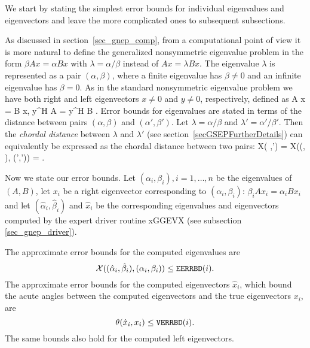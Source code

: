 We start by stating the simplest error bounds for individual eigenvalues
and eigenvectors and leave the more complicated ones to subsequent
subsections. 

As discussed in section~\ref{sec_gnep_comp},
from a computational point of view it is more natural to define
the generalized nonsymmetric eigenvalue problem in
the form $\beta A x = \alpha B x$ with $\lambda = \alpha / \beta$
instead of $A x = \lambda B x$.  The eigenvalue $\lambda$ is represented
as a pair $(\alpha, \beta)$, where a finite
eigenvalue has $\beta \neq 0$ and an infinite eigenvalue has $\beta = 0$.
As in the standard nonsymmetric eigenvalue problem we have both right
and left eigenvectors $x \neq 0$ and $y \neq 0$, respectively, defined as
\bq\label{eq411.1}
\beta A x = \alpha B x, \quad \beta y^H A  = \alpha y^H B .
\eq
Error bounds for eigenvalues are stated in terms of
the distance between pairs $(\alpha, \beta)$ and $(\alpha',\beta')$.
Let $\lambda = \alpha/\beta$ and $\lambda' = \alpha'/\beta'$.
Then the {\em chordal distance} between $\lambda$ and
$\lambda'$ (see section~\ref{secGSEPFurtherDetails})
can equivalently be expressed as the chordal distance between two pairs:
\bq\label{eq411.2}
{\cal X}( \lambda,\lambda') =
{\cal X}((\alpha, \beta), (\alpha',\beta')) = .
\eq

Now we state our error bounds.
Let $({\alpha}_i, {\beta}_i), i = 1, \ldots, n$ be the eigenvalues of $(A, B)$,
let $x_i$ be a right eigenvector corresponding to $({\alpha}_i, {\beta}_i)$:
${\beta}_i A x_i = {\alpha}_i B x_i$ and let
$({\hat{\alpha}}_i, {\hat{\beta}}_i)$
and $\hat{x}_i$ be the corresponding eigenvalues and
eigenvectors computed by the expert driver routine
xGGEVX (see subsection \ref{sec_gnep_driver}).

The approximate error bounds for the computed eigenvalues are
\[
{\cal X}(({\hat{\alpha}}_i, {\hat{\beta}}_i), ({\alpha}_i, {\beta}_i)) \leq
{\tt EERRBD}(i) .
\]
The approximate error bounds
for the computed eigenvectors $\hat{x}_i$, which
bound the acute angles between the computed eigenvectors and the true
eigenvectors $x_i$, are
\[
\theta(\hat{x}_i, x_i) \leq {\tt VERRBD}(i) .
\]
The same bounds also hold for the computed left eigenvectors.

